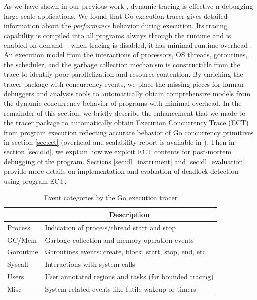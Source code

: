 %
As we have shown in our previous work \cite{parlot,difftrace},
dynamic tracing is effective n debugging large-scale applications.
%
We found that Go execution tracer \cite{go-cmd-trace} gives detailed information about the \textit{performance} behavior during execution.
%
Its tracing capability is compiled into all programs always through the runtime and is enabled on demand -- when tracing is disabled, it has minimal runtime overhead \cite{go-exec-tracer-doc}.
%
An execution model from the interactions of processors, OS threads, goroutines, the scheduler, and the garbage collection mechanism is constructible from the trace to identify poor parallelization and resource contention.
%
By enriching the tracer package with concurrency events, we place the missing pieces for human debuggers
and analysis tools to automatically obtain comprehensive models from the dynamic concurrency behavior of programs with minimal overhead.
%
In the remainder of this section, we briefly describe the enhancement that we made to the tracer package to automatically obtain Execution Concurrency Trace (ECT) from program execution reflecting accurate behavior of Go concurrency primitives in section \ref{sec:ect} (overhead and scalability report is available in \cite{ect-arxiv}).
%
Then in section \ref{sec:dld}, we explain how we exploit ECT contents for post-mortem debugging of the program.
%
Sections \ref{sec:dl_instrument} and \ref{sec:dl_evaluation} provide more details on implementation and evaluation of deadlock detection using program ECT.

\begin{table}[]
    \centering
        \begin{tabular}{|l|l|}
        \hline
        \rowcolor[HTML]{C0C0C0}
        \multicolumn{1}{|c|}{\cellcolor[HTML]{C0C0C0}\textbf{Category}} & \multicolumn{1}{c|}{\cellcolor[HTML]{C0C0C0}\textbf{Description}} \\ \hline
        Process & Indication of process/thread start and stop \\ \hline
        GC/Mem & Garbage collection and memory operation events\\ \hline
        Goroutine & Goroutines events: create, block, start, stop, end, etc. \\ \hline
        Syscall & Interactions with system calls \\ \hline
        Users & User annotated regions and tasks (for bounded tracing) \\ \hline
        Misc & System related events like futile wakeup or timers \\ \hline
        \end{tabular}

    \caption{Event categories by the Go execution tracer}
    \label{tab:events}
\end{table}




